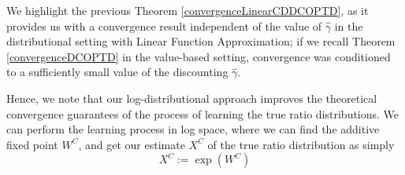 \documentclass[12pt,a4paper,openright,twoside]{article}
\DeclareMathOperator*{\E}{\mathbb{E}}
\numberwithin{equation}{section}
\theoremstyle{definition}
\theoremstyle{remark}
\theoremstyle{plain}
\begin{document}
We highlight the previous Theorem \ref{convergenceLinearCDDCOPTD}, as it provides us with a convergence result independent of the value of $\hat{\gamma}$ in the distributional setting with Linear Function Approximation; if we recall Theorem \ref{convergenceDCOPTD} in the value-based setting, convergence was conditioned to a sufficiently small value of the discounting $\hat{\gamma}$.

Hence, we note that our log-distributional approach improves the theoretical convergence guarantees of the process of learning the true ratio distributions. We can perform the learning process in log space, where we can find the additive fixed point $W^C$, and get our estimate $X^C$ of the true ratio distribution as simply
\begin{equation*}
	X^C := \exp (W^C)
\end{equation*}

\end{document}
